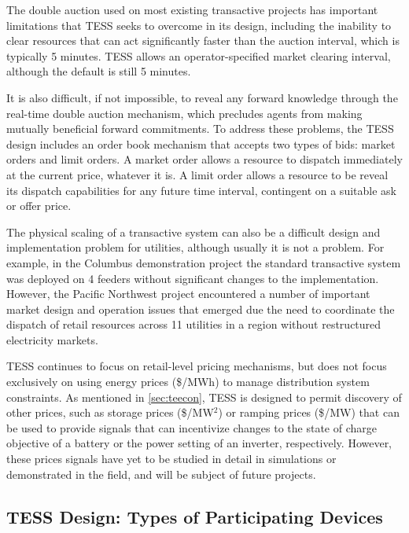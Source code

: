 The double auction used on most existing transactive projects has important limitations that TESS seeks to overcome in its design, including the inability to clear resources that can act significantly faster than the auction interval, which is typically 5 minutes. TESS allows an operator-specified market clearing interval, although the default is still 5 minutes. 

It is also difficult, if not impossible, to reveal any forward knowledge through the real-time double auction  mechanism, which precludes agents from making mutually beneficial forward commitments. To address these problems, the TESS design includes an order book mechanism that accepts two types of bids: market orders and limit orders. A market order allows a resource to dispatch immediately at the current price, whatever it is. A limit order allows a resource to be reveal its dispatch capabilities for any future time interval, contingent on a suitable ask or offer price.

The physical scaling of a transactive system can also be a difficult design and implementation problem for utilities, although usually it is not a problem. For example, in the Columbus demonstration project \citep{Widergren2014} the standard transactive system was deployed on 4 feeders without significant changes to the implementation.  However, the Pacific Northwest project \citep{hammerstrom2015pacific} encountered a number of important market design and operation issues that emerged due the need to coordinate the dispatch of retail resources across 11 utilities in a region without restructured electricity markets.

TESS continues to focus on retail-level pricing mechanisms, but does not focus exclusively on using energy prices (\$/MWh) to manage distribution system constraints.  As mentioned in \ref{sec:teecon}, TESS is designed to permit discovery of other prices, such as storage prices (\$/MW$^2$) or ramping prices (\$/MW) that can be used to provide signals that can incentivize changes to the state of charge objective of a battery or the power setting of an inverter, respectively.  However, these prices signals have yet to be studied in detail in simulations or demonstrated in the field, and will be subject of future projects.

\subsection{TESS Design: Types of Participating Devices}\label{sec:devices}

